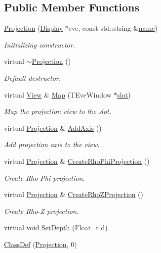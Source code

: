 \subsection*{Public Member Functions}
\begin{DoxyCompactItemize}
\item 
\hyperlink{class_d_d4hep_1_1_projection_a2fc1deae77bf065c122bd6d5c4f1abf7}{Projection} (\hyperlink{class_d_d4hep_1_1_display}{Display} $\ast$eve, const std\+::string \&\hyperlink{class_d_d4hep_1_1_view_ae369eadf16399a6bf34f1ce491b7a788}{name})
\begin{DoxyCompactList}\small\item\em Initializing constructor. \end{DoxyCompactList}\item 
virtual \hyperlink{class_d_d4hep_1_1_projection_ac0554f994078308f0169a4629a2d1b0a}{$\sim$\+Projection} ()
\begin{DoxyCompactList}\small\item\em Default destructor. \end{DoxyCompactList}\item 
virtual \hyperlink{class_d_d4hep_1_1_view}{View} \& \hyperlink{class_d_d4hep_1_1_projection_a68380e96afb21b0c4fd52e986032df80}{Map} (T\+Eve\+Window $\ast$\hyperlink{_multi_view_8cpp_a402e7b855ac7bcf09e2ecf5e98220a11}{slot})
\begin{DoxyCompactList}\small\item\em Map the projection view to the slot. \end{DoxyCompactList}\item 
virtual \hyperlink{class_d_d4hep_1_1_projection}{Projection} \& \hyperlink{class_d_d4hep_1_1_projection_a06d9f151c2e689580f04967905bd97b8}{Add\+Axis} ()
\begin{DoxyCompactList}\small\item\em Add projection axis to the view. \end{DoxyCompactList}\item 
virtual \hyperlink{class_d_d4hep_1_1_projection}{Projection} \& \hyperlink{class_d_d4hep_1_1_projection_aa2e3b7e69527aca46f8531e4fc523f1f}{Create\+Rho\+Phi\+Projection} ()
\begin{DoxyCompactList}\small\item\em Create Rho-\/\+Phi projection. \end{DoxyCompactList}\item 
virtual \hyperlink{class_d_d4hep_1_1_projection}{Projection} \& \hyperlink{class_d_d4hep_1_1_projection_ade3fca7391ef9616f9b9235d4e07a423}{Create\+Rho\+Z\+Projection} ()
\begin{DoxyCompactList}\small\item\em Create Rho-\/Z projection. \end{DoxyCompactList}\item 
virtual void \hyperlink{class_d_d4hep_1_1_projection_a6c7fc010be5b3df698158c82b56c9cde}{Set\+Depth} (Float\+\_\+t d)
\item 
\hyperlink{class_d_d4hep_1_1_projection_a32d78dc00500fcb000ce25052c96fd62}{Class\+Def} (\hyperlink{class_d_d4hep_1_1_projection}{Projection}, 0)
\end{DoxyCompactItemize}
